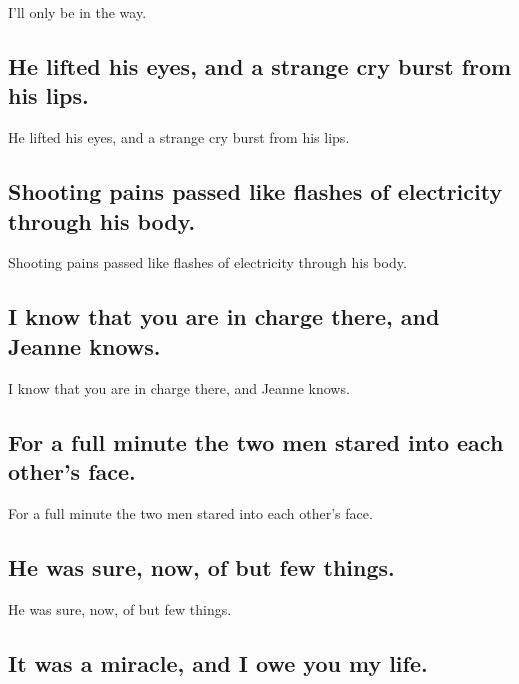 \documentclass[]{article}
\begin{document}
I'll only be in the way.

\hypertarget{he-lifted-his-eyes-and-a-strange-cry-burst-from-his-lips.}{%
\subsection{He lifted his eyes, and a strange cry burst from his
lips.}\label{he-lifted-his-eyes-and-a-strange-cry-burst-from-his-lips.}}

He lifted his eyes, and a strange cry burst from his lips.

\hypertarget{shooting-pains-passed-like-flashes-of-electricity-through-his-body.}{%
\subsection{Shooting pains passed like flashes of electricity through
his
body.}\label{shooting-pains-passed-like-flashes-of-electricity-through-his-body.}}

Shooting pains passed like flashes of electricity through his body.

\hypertarget{i-know-that-you-are-in-charge-there-and-jeanne-knows.}{%
\subsection{I know that you are in charge there, and Jeanne
knows.}\label{i-know-that-you-are-in-charge-there-and-jeanne-knows.}}

I know that you are in charge there, and Jeanne knows.

\hypertarget{for-a-full-minute-the-two-men-stared-into-each-others-face.}{%
\subsection{For a full minute the two men stared into each other's
face.}\label{for-a-full-minute-the-two-men-stared-into-each-others-face.}}

For a full minute the two men stared into each other's face.

\hypertarget{he-was-sure-now-of-but-few-things.}{%
\subsection{He was sure, now, of but few
things.}\label{he-was-sure-now-of-but-few-things.}}

He was sure, now, of but few things.

\hypertarget{it-was-a-miracle-and-i-owe-you-my-life.}{%
\subsection{It was a miracle, and I owe you my
life.}\label{it-was-a-miracle-and-i-owe-you-my-life.}}
\end{document}
